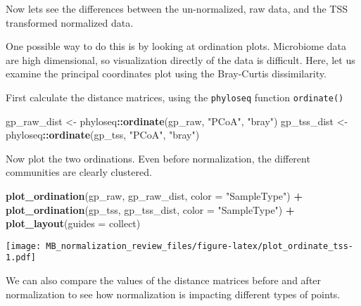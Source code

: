 \documentclass[
]{book}
\newenvironment{Shaded}{\begin{snugshade}}{\end{snugshade}}
\newcommand{\DataTypeTok}[1]{\textcolor[rgb]{0.13,0.29,0.53}{#1}}
\newcommand{\KeywordTok}[1]{\textcolor[rgb]{0.13,0.29,0.53}{\textbf{#1}}}
\newcommand{\NormalTok}[1]{#1}
\newcommand{\OperatorTok}[1]{\textcolor[rgb]{0.81,0.36,0.00}{\textbf{#1}}}
\newcommand{\StringTok}[1]{\textcolor[rgb]{0.31,0.60,0.02}{#1}}
\begin{document}
Now lets see the differences between the un-normalized, raw data, and the TSS transformed normalized data.

One possible way to do this is by looking at ordination plots. Microbiome data are high dimensional, so visualization directly of the data is difficult. Here, let us examine the principal coordinates plot using the Bray-Curtis dissimilarity.

First calculate the distance matrices, using the \texttt{phyloseq} function \texttt{ordinate()}

\begin{Shaded}
\begin{Highlighting}[]
\NormalTok{gp\_raw\_dist \textless{}{-}}\StringTok{ }\NormalTok{phyloseq}\OperatorTok{::}\KeywordTok{ordinate}\NormalTok{(gp\_raw, }\StringTok{"PCoA"}\NormalTok{, }\StringTok{"bray"}\NormalTok{)}
\NormalTok{gp\_tss\_dist \textless{}{-}}\StringTok{ }\NormalTok{phyloseq}\OperatorTok{::}\KeywordTok{ordinate}\NormalTok{(gp\_tss, }\StringTok{"PCoA"}\NormalTok{, }\StringTok{"bray"}\NormalTok{)}
\end{Highlighting}
\end{Shaded}

Now plot the two ordinations. Even before normalization, the different communities are clearly clustered.

\begin{Shaded}
\begin{Highlighting}[]
\KeywordTok{plot\_ordination}\NormalTok{(gp\_raw, gp\_raw\_dist, }\DataTypeTok{color =} \StringTok{"SampleType"}\NormalTok{) }\OperatorTok{+}\StringTok{ }
\KeywordTok{plot\_ordination}\NormalTok{(gp\_tss, gp\_tss\_dist, }\DataTypeTok{color =} \StringTok{"SampleType"}\NormalTok{) }\OperatorTok{+}
\StringTok{  }\KeywordTok{plot\_layout}\NormalTok{(}\DataTypeTok{guides =} \StringTok{\textquotesingle{}collect\textquotesingle{}}\NormalTok{)}
\end{Highlighting}
\end{Shaded}

\texttt{[image: MB\_normalization\_review\_files/figure-latex/plot\_ordinate\_tss-1.pdf]}

We can also compare the values of the distance matrices before and after normalization to see how normalization is impacting different types of points.
\end{document}
